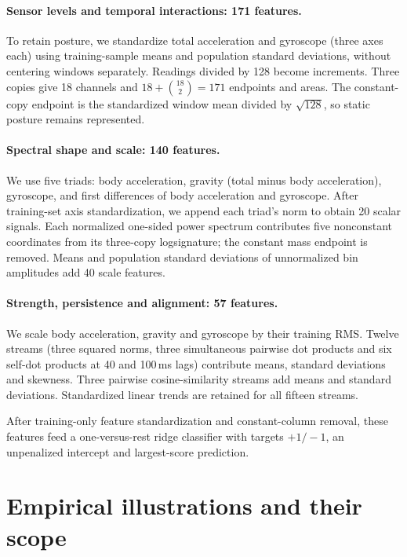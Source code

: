 \documentclass[a4paper]{esannV2}
\begin{document}
\paragraph{Sensor levels and temporal interactions: 171 features.}
To retain posture, we standardize total acceleration and gyroscope (three axes
each) using training-sample means and population standard deviations, without
centering windows separately. Readings divided by 128 become increments. Three copies
give 18 channels and $18+\binom{18}{2}=171$ endpoints and areas. The
constant-copy endpoint is the standardized window mean divided by
$\sqrt{128}$, so static posture remains represented.

\paragraph{Spectral shape and scale: 140 features.}
We use five triads: body acceleration,
gravity (total minus body acceleration),
gyroscope, and first differences of body acceleration and gyroscope.
After training-set axis standardization, we append each triad's norm to obtain
20 scalar signals. Each normalized one-sided power spectrum contributes five
nonconstant coordinates from its three-copy logsignature; the constant
mass endpoint is removed. Means and population standard deviations of
unnormalized bin amplitudes add 40 scale features.

\paragraph{Strength, persistence and alignment: 57 features.}
We scale body acceleration, gravity and gyroscope by their training RMS.
Twelve streams (three squared norms, three simultaneous pairwise dot products
and six self-dot products at 40 and 100\,ms lags) contribute means, standard
deviations and skewness. Three pairwise cosine-similarity streams add means
and standard deviations. Standardized linear trends are retained for all fifteen streams.

After training-only feature standardization and constant-column removal, these
features feed a one-versus-rest ridge classifier with targets $+1/-1$, an
unpenalized intercept and largest-score prediction.

\section{Empirical illustrations and their scope}
\end{document}
